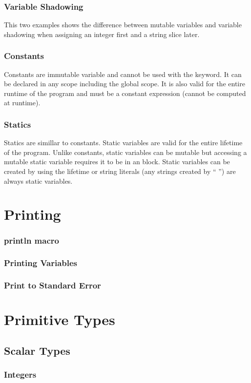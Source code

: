 \documentclass{beamer}
\begin{document}
\begin{frame}
  \frametitle{Variable Shadowing}
  This two examples shows the difference between mutable variables and variable shadowing when assigning an integer first and a string slice later.
  
  
\end{frame}

\begin{frame}
  \frametitle{Constants}
  Constants are immutable variable and cannot be used with the  keyword. It can be declared in any scope including the global scope. It is also valid for the entire runtime of the program and must be a constant expression (cannot be computed at runtime).
  
\end{frame}

\begin{frame}
  \frametitle{Statics}
  Statics are simillar to constants. Static variables are valid for the entire lifetime of the program. Unlike constants, static variables can be mutable but accessing a mutable static variable requires it to be in an  block. Static variables can be created by using the  lifetime or string literals (any strings created by `` '') are always static variables.
  
\end{frame}

\section{Printing}
\begin{frame}
  \frametitle{println macro}
\end{frame}

\begin{frame}
  \frametitle{Printing Variables}
\end{frame}

\begin{frame}
  \frametitle{Print to Standard Error}
\end{frame}

\section{Primitive Types}
\subsection{Scalar Types}
\begin{frame}
  \frametitle{Integers}
\end{frame}
\end{document}
